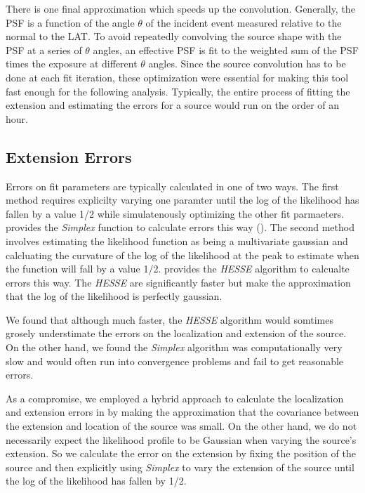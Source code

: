 \documentclass[12pt,preprint]{aastex}
\newcommand{\pointlike}{\text{\em pointlike}\xspace}
\newcommand{\minuit}{\text{\em Minuit}\xspace}
\begin{document}
There is one final approximation which speeds up the convolution.
Generally, the PSF is a function of the angle $\theta$ of the incident
event measured relative to the normal to the LAT. To avoid repeatedly
convolving the source shape with the PSF at a series of $\theta$ angles,
an effective PSF is fit to the weighted sum of the PSF times the exposure
at different $\theta$ angles.  Since the source convolution has to be
done at each fit iteration, these optimization were essential for making
this tool fast enough for the following analysis. Typically, the entire
process of fitting the extension and estimating the errors for a source
would run on the order of an hour.

\subsection{Extension Errors}

Errors on fit parameters are typically calculated in one of two
ways. The first method requires explicilty varying one paramter until
the log of the likelihood has fallen by a value 1/2 while simulatenously
optimizing the other fit parmaeters.  \minuit provides the {\em Simplex}
function to calculate errors this way (\cite{minuit_documentation}).
The second method involves estimating the likelihood function as being
a multivariate gaussian and calcluating the curvature of the log of
the likelihood at the peak to estimate when the function will fall by
a value 1/2. \minuit provides the {\em HESSE} algorithm to calcualte
errors this way.  The {\em HESSE} are significantly faster but make the
approximation that the log of the likelihood is perfectly gaussian.

We found that although much faster, the {\em HESSE} algorithm would
somtimes grosely understimate the errors on the localization and extension
of the source.  On the other hand, we found the {\em Simplex} algorithm
was computationally very slow and would often run into convergence
problems and fail to get reasonable errors.

As a compromise, we employed a hybrid approach to calculate
the localization and extension errors in \pointlike by making the
approximation that the covariance between the extension and location of
the source was small. On the other hand, we do not necessarily expect the
likelihood profile to be Gaussian when varying the source's extension.
So we calculate the error on the extension by fixing the position of the
source and then explicitly using {\em Simplex} to vary the extension of
the source until the log of the likelihood has fallen by 1/2.
\end{document}
